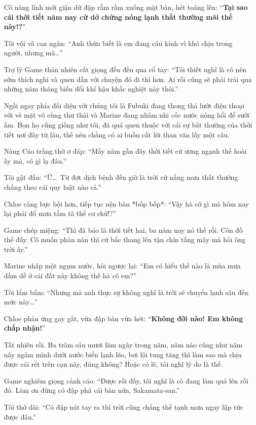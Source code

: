 \documentclass[../main.tex]{subfiles}
\begin{document}
Cô nàng lính mới giận dữ đập rầm rầm xuống mặt bàn, hét toáng lên: ``\textbf{Tại sao cái thời tiết năm nay cứ dở chứng nóng lạnh thất thường mãi thế này!?}''


Tôi vội vã can ngăn: ``Anh thừa biết là em đang cáu kỉnh vì khó chịu trong người, nhưng mà\dots''

Trợ lý Game thản nhiên cất giọng đều đều qua cổ tay: ``Tôi thiết nghĩ là cô nên sớm thích nghi và quen dần với chuyện đó đi thì hơn. Ai rồi cũng sẽ phải trải qua những năm tháng biến đổi khí hậu khắc nghiệt này thôi.''

Ngồi ngay phía đối diện với chúng tôi là Fubuki đang thong thả lướt điện thoại với vẻ mặt vô cùng thư thái và Marine đang nhâm nhi cốc nước nóng hổi để sưởi ấm. Bọn họ cũng giống như tôi, đã quá quen thuộc với cái sự bất thường của thời tiết nơi đây từ lâu, thế nên chẳng có ai buồn cất lời than vãn lấy một câu.

Nàng Cáo trắng thờ ơ đáp: ``Mấy năm gần đây thời tiết cứ ương ngạnh thế hoài ấy mà, có gì lạ đâu.''

Tôi gật đầu: ``Ừ\dots\ Từ đợt dịch bệnh đến giờ là trời cứ nắng mưa thất thường chẳng theo cái quy luật nào cả.''

Chloe càng bực bội hơn, tiếp tục nện bàn *bốp bốp*: ``Vậy hà cớ gì mà hôm nay lại phải đổ mưa tầm tã thế cơ chứ!?''

Game chép miệng: ``Thì đã bảo là thời tiết hai, ba năm nay nó thế rồi. Côn đồ thế đấy. Cô muốn phàn nàn thì cứ bắc thang lên tận chín tầng mây mà hỏi ông trời ấy.''

Marine nhấp một ngụm nước, hỏi ngược lại: ``Em có hiểu thế nào là mùa mưa dầm dề ở cái đất này không thế hả cô em?''

Tôi lẩm bẩm: ``Nhưng mà anh thực sự không nghĩ là trời sẽ chuyển lạnh sâu đến mức này\dots''

Chloe phản ứng gay gắt, vừa đập bàn vừa hét: ``\textbf{Không đời nào! Em không chấp nhận!}''

Tất nhiên rồi. Ba trăm sáu mươi lăm ngày trong năm, năm nào cũng như năm nấy ngâm mình dưới nước biển lạnh lẽo, bơi lội tung tăng thì làm sao mà chịu được cái rét trên cạn này, đúng không? Hoặc có lẽ, tôi nghĩ lý do là thế.

Game nghiêm giọng cảnh cáo: ``Được rồi đấy, tôi nghĩ là cô đang làm quá lên rồi đó. Làm ơn đừng có đập phá cái bàn nữa, Sakamata-san.''

Tôi thở dài: ``Có đập nát tay ra thì trời cũng chẳng thể tạnh mưa ngay lập tức được đâu.''
\end{document}
